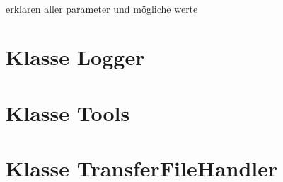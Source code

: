 \paragraph{}
erklaren aller parameter und mögliche werte
\subsection{}

\newpage


\section{Klasse Logger}
\paragraph{}

\subsection{}

\newpage


\section{Klasse Tools}
\paragraph{}

\subsection{}

\newpage


\section{Klasse TransferFileHandler}
\paragraph{}

\subsection{}